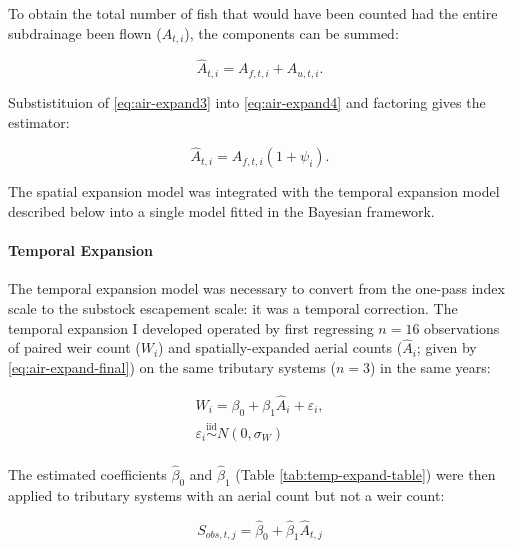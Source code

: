 \documentclass[12pt,]{book}
\let\oldparagraph\paragraph
\renewcommand{\paragraph}[1]{\oldparagraph{#1}\mbox{}}
\theoremstyle{definition}
\theoremstyle{definition}
\theoremstyle{definition}
\theoremstyle{remark}
\begin{document}
\noindent
To obtain the total number of fish that would have been counted had the
entire subdrainage been flown (\(\hat{A}_{t,i}\)), the components can be
summed:

\begin{equation}
  \hat{A}_{t,i} = A_{f,t,i} + A_{u,t,i}.
  \label{eq:air-expand4}
\end{equation}

\noindent
Substistituion of \eqref{eq:air-expand3} into \eqref{eq:air-expand4} and
factoring gives the estimator:

\begin{equation}
  \hat{A}_{t,i}=A_{f,t,i}(1 + \psi_i).
  \label{eq:air-expand-final}
\end{equation}

\noindent
The spatial expansion model was integrated with the temporal expansion
model described below into a single model fitted in the Bayesian
framework.

\paragraph{Temporal Expansion}\label{temp-expansion}

\noindent
The temporal expansion model was necessary to convert from the one-pass
index scale to the substock escapement scale: it was a temporal
correction. The temporal expansion I developed operated by first
regressing \(n = 16\) observations of paired weir count (\(W_i\)) and
spatially-expanded aerial counts (\(\hat{A}_{i}\); given by
\eqref{eq:air-expand-final}) on the same tributary systems (\(n = 3\)) in
the same years:

\begin{equation}
  \begin{split}
    W_i = \beta_0 + \beta_1 \hat{A}_i + \varepsilon_i, \\
    \varepsilon_i \stackrel{\text{iid}}{\sim} N(0, \sigma_W) \\
  \end{split}
\label{eq:temp-expand1}
\end{equation}

The estimated coefficients \(\hat{\beta}_0\) and \(\hat{\beta}_1\)
(Table \ref{tab:temp-expand-table}) were then applied to tributary
systems with an aerial count but not a weir count:

\begin{equation}
  S_{obs,t,j}=\hat{\beta}_0 + \hat{\beta}_1 \hat{A}_{t,j}
\label{eq:temp-expand2}
\end{equation}
\end{document}
